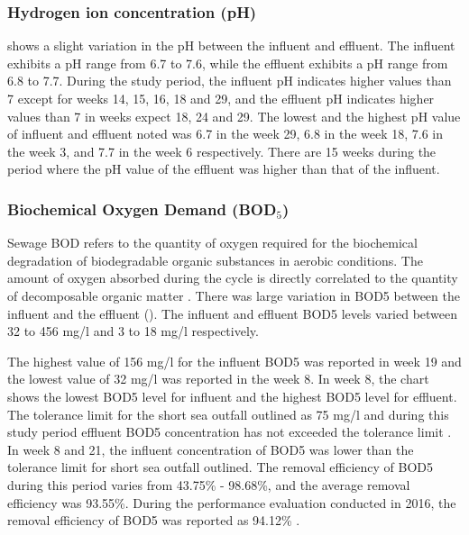 

\subsubsection{Hydrogen ion concentration (pH)}
 shows a slight variation in the pH between the influent and effluent. The influent exhibits a pH range from 6.7 to 7.6, while the effluent exhibits a pH range from 6.8 to 7.7. During the study period, the influent pH indicates higher values than 7 except for weeks 14, 15, 16, 18 and 29, and the effluent pH indicates higher values than 7 in weeks expect 18, 24 and 29. The lowest and the highest pH value of influent and effluent noted was 6.7 in the week 29, 6.8 in the week 18, 7.6 in the week 3, and 7.7 in the week 6 respectively. There are 15 weeks during the period where the pH value of the effluent was higher than that of the influent.



\subsubsection{Biochemical Oxygen Demand (BOD$_5$)}
Sewage \ac{BOD} refers to the quantity of oxygen required for the biochemical degradation of biodegradable organic substances in aerobic conditions. The amount of oxygen absorbed during the cycle is directly correlated to the quantity of decomposable organic matter \cite{Prasad2020}. There was large variation in \ac{BOD5} between the influent and the effluent (). The influent and effluent \ac{BOD5} levels varied between 32 to 456 mg/l and 3 to 18 mg/l respectively. 

The highest value of 156 mg/l for the influent \ac{BOD5} was reported in week 19 and the lowest value of 32 mg/l was reported in the week 8. In week 8, the chart shows the lowest \ac{BOD5} level for influent and the highest \ac{BOD5} level for effluent. The tolerance limit for the short sea outfall outlined as 75 mg/l and during this study period effluent \ac{BOD5} concentration has not exceeded the tolerance limit \cite{CEA2022}. In week 8 and 21, the influent concentration of \ac{BOD5} was lower than the tolerance limit for short sea outfall outlined. The removal efficiency of \ac{BOD5} during this period varies from 43.75\% - 98.68\%, and the average removal efficiency was 93.55\%. During the performance evaluation conducted in 2016, the removal efficiency of \ac{BOD5} was reported as 94.12\% \cite{Danushika2016}.

